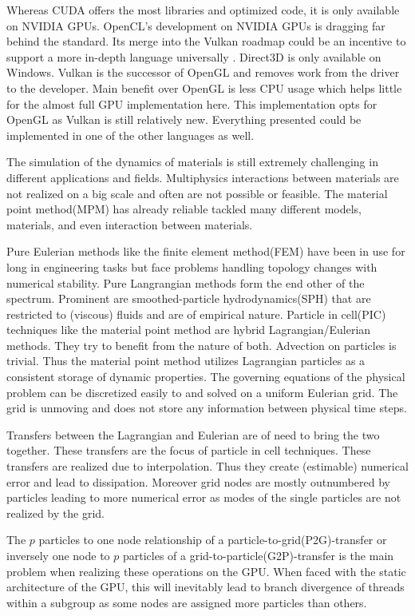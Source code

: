 \documentclass[m,times]{cgMA}
\begin{document}
Whereas CUDA offers the most libraries and optimized code, it is only available on NVIDIA GPUs. OpenCL's development on NVIDIA GPUs is dragging far behind the standard. Its merge into the Vulkan roadmap could be an incentive to support a more in-depth language universally \cite{OPENCL:ROADMAP}. Direct3D is only available on Windows. Vulkan is the successor of OpenGL and removes work from the driver to the developer. Main benefit over OpenGL is less CPU usage which helps little for the almost full GPU implementation here. This implementation opts for OpenGL as Vulkan is still relatively new. Everything presented could be implemented in one of the other languages as well.

The simulation of the dynamics of materials is still extremely challenging in different applications and fields. Multiphysics interactions between materials are not realized on a big scale and often are not possible or feasible. The material point method(MPM) has already reliable tackled many different models, materials, and even interaction between materials.

Pure Eulerian methods like the finite element method(FEM) have been in use for long in engineering tasks but face problems handling topology changes with numerical stability. Pure Langrangian methods form the end other of the spectrum. Prominent are smoothed-particle hydrodynamics(SPH) that are restricted to (viscous) fluids and are of empirical nature. Particle in cell(PIC) techniques like the material point method are hybrid Lagrangian/Eulerian methods. They try to benefit from the nature of both. Advection on particles is trivial. Thus the material point method utilizes Lagrangian particles as a consistent storage of dynamic properties. The governing equations of the physical problem can be discretized easily to and solved on a uniform Eulerian grid. The grid is unmoving and does not store any information between physical time steps.

Transfers between the Lagrangian and Eulerian are of need to bring the two together. These transfers are the focus of particle in cell techniques. These transfers are realized due to interpolation. Thus they create (estimable) numerical error and lead to dissipation. Moreover grid nodes are mostly outnumbered by particles leading to more numerical error as modes of the single particles are not realized by the grid.

The $p$ particles to one node relationship of a particle-to-grid(P2G)-transfer or inversely one node to $p$ particles of a grid-to-particle(G2P)-transfer is the main problem when realizing these operations on the GPU. When faced with the static architecture of the GPU, this will inevitably lead to branch divergence of threads within a subgroup as some nodes are assigned more particles than others.
\end{document}
